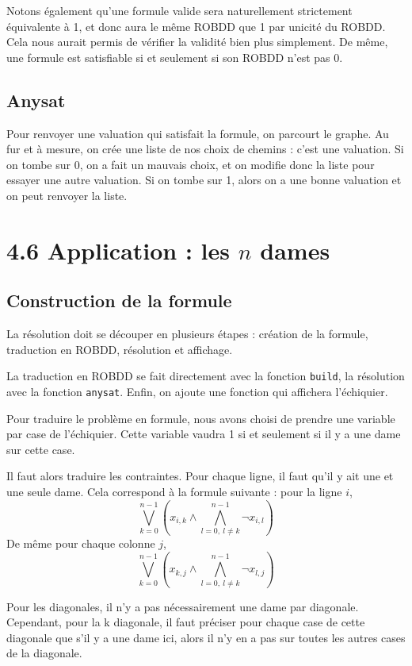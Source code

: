\documentclass[12pt]{article}
\def\code#1{\texttt{#1}}
\begin{document}
Notons également qu'une formule valide sera naturellement strictement équivalente à 1, et donc aura le même ROBDD que 1 par unicité du ROBDD. Cela nous aurait permis de vérifier la validité bien plus simplement. De même, une formule est satisfiable si et seulement si son ROBDD n'est pas 0.

\subsection*{Anysat}
Pour renvoyer une valuation qui satisfait la formule, on parcourt le graphe. Au fur et à mesure, on crée une liste de nos choix de chemins : c'est une valuation. Si on tombe sur 0, on a fait un mauvais choix, et on modifie donc la liste pour essayer une autre valuation. Si on tombe sur 1, alors on a une bonne valuation et on peut renvoyer la liste.

\section*{4.6 Application : les $n$ dames}

\subsection*{Construction de la formule}
La résolution doit se découper en plusieurs étapes : création de la formule, traduction en ROBDD, résolution et affichage.

La traduction en ROBDD se fait directement avec la fonction \code {build}, la résolution avec la fonction \code{anysat}. Enfin, on ajoute une fonction qui affichera l'échiquier.

Pour traduire le problème en formule, nous avons choisi de prendre une variable par case de l'échiquier. Cette variable vaudra 1 si et seulement si il y a une dame sur cette case.

Il faut alors traduire les contraintes. Pour chaque ligne, il faut qu'il y ait une et une seule dame. Cela correspond à la formule suivante :
pour la ligne $i$,
$$\bigvee_{k=0}^{n-1} \left( x_{i,k}\wedge\bigwedge_{l=0,\ l\neq k}^{n-1} \neg x_{i,l}\right)$$
De même pour chaque colonne $j$,
$$\bigvee_{k=0}^{n-1} \left( x_{k,j}\wedge\bigwedge_{l=0,\ l\neq k}^{n-1} \neg x_{l,j}\right)$$

Pour les diagonales, il n'y a pas nécessairement une dame par diagonale. Cependant, pour la k diagonale, il faut préciser pour chaque case de cette diagonale que s'il y a une dame ici, alors il n'y en a pas sur toutes les autres cases de la diagonale.
\end{document}
